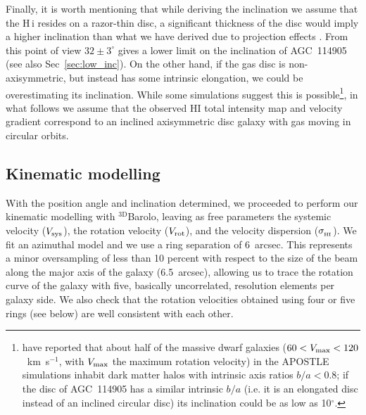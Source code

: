 \documentclass[fleqn,usenatbib]{mnras}
\begin{document}
Finally, it is worth mentioning that while deriving the inclination we assume that the H\,{\sc i} resides on a razor-thin disc, a significant thickness of the disc would imply a higher inclination than what we have derived due to projection effects \citep{iorio_phd}. From this point of view $32 \pm 3^\circ$ gives a lower limit on the inclination of AGC~114905 (see also Sec~\ref{sec:low_inc}). On the other hand, if the gas disc is non-axisymmetric, but instead has some intrinsic elongation, we could be overestimating its inclination. While some simulations suggest this is possible\footnote{\citet{marasco_barsinDM} have reported that about half of the massive dwarf galaxies ($60 < V_{\rm max} < 120$~km~s$^{-1}$, with $V_{\rm max}$ the maximum rotation velocity) in the APOSTLE simulations \citep{apostle_sawala,fattahi_apostle} inhabit dark matter halos with intrinsic axis ratios $b/a < 0.8$; if the disc of AGC~114905 has a similar intrinsic $b/a$ (i.e. it is an elongated disc instead of an inclined circular disc) its inclination could be as low as 10$^\circ$.}, in what follows we assume that the observed HI total intensity map and velocity gradient correspond to an inclined axisymmetric disc galaxy with gas moving in circular orbits. 


\subsection{Kinematic modelling}

With the position angle and inclination determined, we proceeded to perform our kinematic modelling with $\mathrm{^{3D}}$Barolo, leaving as free parameters the systemic velocity ($V_{\rm sys}$), the rotation velocity ($V_{\rm rot}$), and the velocity dispersion ($\sigma_{_{\rm HI}}$). We fit an azimuthal model and we use a ring separation of 6~arcsec. This represents a minor oversampling of less than 10 percent with respect to the size of the beam along the major axis of the galaxy (6.5~arcsec), allowing us to trace the rotation curve of the galaxy with five, basically uncorrelated, resolution elements per galaxy side. We also check that the rotation velocities obtained using four or five rings (see below) are well consistent with each other.
\end{document}

